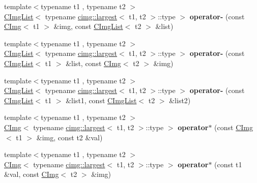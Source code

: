 \begin{DoxyCompactItemize}
\item 
\hypertarget{namespacecimg__library_a1b13372ea66d9f65ad28d67e5cc9d0ac}{
{\footnotesize template$<$typename t1 , typename t2 $>$ }\\\hyperlink{structcimg__library_1_1_c_img_list}{CImgList}$<$ typename \hyperlink{structcimg__library_1_1cimg_1_1largest}{cimg::largest}$<$ t1, t2 $>$::type $>$ {\bfseries operator-\/} (const \hyperlink{structcimg__library_1_1_c_img}{CImg}$<$ t1 $>$ \&img, const \hyperlink{structcimg__library_1_1_c_img_list}{CImgList}$<$ t2 $>$ \&list)}
\label{namespacecimg__library_a1b13372ea66d9f65ad28d67e5cc9d0ac}

\item 
\hypertarget{namespacecimg__library_a0a9451daca3f81c7d6fbc9574130b8e4}{
{\footnotesize template$<$typename t1 , typename t2 $>$ }\\\hyperlink{structcimg__library_1_1_c_img_list}{CImgList}$<$ typename \hyperlink{structcimg__library_1_1cimg_1_1largest}{cimg::largest}$<$ t1, t2 $>$::type $>$ {\bfseries operator-\/} (const \hyperlink{structcimg__library_1_1_c_img_list}{CImgList}$<$ t1 $>$ \&list, const \hyperlink{structcimg__library_1_1_c_img}{CImg}$<$ t2 $>$ \&img)}
\label{namespacecimg__library_a0a9451daca3f81c7d6fbc9574130b8e4}

\item 
\hypertarget{namespacecimg__library_a6c4e2ce187eb7e9413f09863aea052b2}{
{\footnotesize template$<$typename t1 , typename t2 $>$ }\\\hyperlink{structcimg__library_1_1_c_img_list}{CImgList}$<$ typename \hyperlink{structcimg__library_1_1cimg_1_1largest}{cimg::largest}$<$ t1, t2 $>$::type $>$ {\bfseries operator-\/} (const \hyperlink{structcimg__library_1_1_c_img_list}{CImgList}$<$ t1 $>$ \&list1, const \hyperlink{structcimg__library_1_1_c_img_list}{CImgList}$<$ t2 $>$ \&list2)}
\label{namespacecimg__library_a6c4e2ce187eb7e9413f09863aea052b2}

\item 
\hypertarget{namespacecimg__library_aa8cd55e772990d984aaeab07f12f6b38}{
{\footnotesize template$<$typename t1 , typename t2 $>$ }\\\hyperlink{structcimg__library_1_1_c_img}{CImg}$<$ typename \hyperlink{structcimg__library_1_1cimg_1_1largest}{cimg::largest}$<$ t1, t2 $>$::type $>$ {\bfseries operator$\ast$} (const \hyperlink{structcimg__library_1_1_c_img}{CImg}$<$ t1 $>$ \&img, const t2 \&val)}
\label{namespacecimg__library_aa8cd55e772990d984aaeab07f12f6b38}

\item 
\hypertarget{namespacecimg__library_ab0b9832d9e8cd877b3acc33858ae8921}{
{\footnotesize template$<$typename t1 , typename t2 $>$ }\\\hyperlink{structcimg__library_1_1_c_img}{CImg}$<$ typename \hyperlink{structcimg__library_1_1cimg_1_1largest}{cimg::largest}$<$ t1, t2 $>$::type $>$ {\bfseries operator$\ast$} (const t1 \&val, const \hyperlink{structcimg__library_1_1_c_img}{CImg}$<$ t2 $>$ \&img)}
\label{namespacecimg__library_ab0b9832d9e8cd877b3acc33858ae8921}


\end{DoxyCompactItemize}
